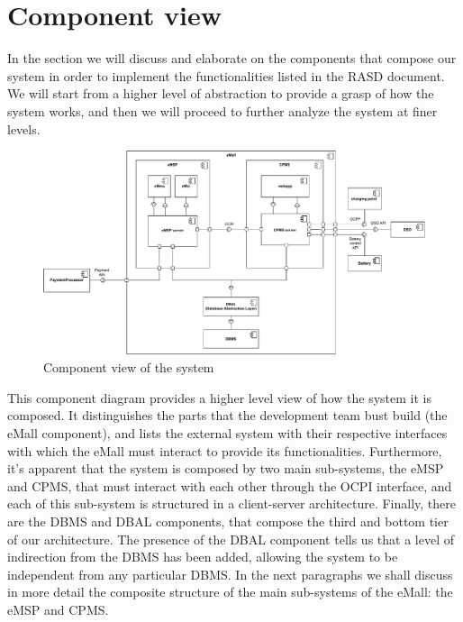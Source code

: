 \section{Component view}
In the section we will discuss and elaborate on the components that compose our system in order to implement the functionalities listed in the RASD document. We will start from a higher level of abstraction to provide a grasp of how the system works, and then we will proceed to further analyze the system at finer levels.
\begin{figure}[H]
    \centering
    \includegraphics[width=1\textwidth]{Images/cp2/component_overview.pdf}
    \caption{Component view of the system}
\end{figure}

This component diagram provides a higher level view of how the system it is composed. It distinguishes the parts that the development team bust build (the eMall component), and lists the external system with their respective interfaces with which the eMall must interact to provide its functionalities. Furthermore, it's apparent that the system is composed by two main sub-systems, the eMSP and CPMS, that must interact with each other through the OCPI interface, and each of this sub-system is structured in a client-server architecture. Finally, there are the DBMS and DBAL components, that compose the third and bottom tier of our architecture. The presence of the DBAL component tells us that a level of indirection from the DBMS has been added, allowing the system to be independent from any particular DBMS.
\medskip
In the next paragraphs we shall discuss in more detail the composite structure of the main sub-systems of the eMall: the eMSP and CPMS.
\pagebreak

